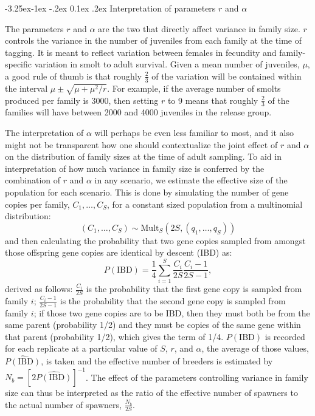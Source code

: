 \documentclass[11pt]{article}
\makeatletter
\renewcommand\subsection{\@startsection{subsection}{2}{\z@}%
                                     {-3.25ex\@plus -1ex \@minus -.2ex}%
                                     {0.1ex \@plus .2ex}%
                                     {\normalfont\normalsize\bfseries}}
\makeatother
\begin{document}
 
\subsection{Interpretation of parameters $r$ and $\alpha$}

The parameters $r$ and $\alpha$ are the two that directly affect variance in family size.  $r$ 
controls the variance in the number of juveniles from each family at the time of tagging.  It is meant
to reflect variation between females in fecundity and family-specific variation in smolt to adult survival.  
Given a mean number of juveniles, $\mu$, a good rule of thumb is that roughly $\frac{2}{3}$ 
of the variation will be contained
within the interval $\mu \pm \sqrt{\mu + \mu^2/r}$.  For example, if the average number of smolts produced
per family is 3000, then setting $r$ to 9 means that roughly $\frac{2}{3}$ of the families will have
between 2000 and 4000 juveniles in the release group.


The interpretation of $\alpha$ will perhaps be even less familiar to most, and it also might not
be transparent how one should contextualize the joint effect of $r$ and $\alpha$ on the distribution
of family sizes at the time of adult sampling.  To aid in interpretation of how much variance in
family size is conferred by the combination of $r$ and $\alpha$ in any scenario, we estimate the
effective size of the population for each scenario.  This is done by simulating the number of
gene copies per family, $C_1,\ldots,C_S$,
for a constant sized population from a multinomial distribution:
\[
(C_1,\ldots, C_S) \sim \mathrm{Mult}_S(2S, (q_1, \ldots, q_S))
\]
and then calculating the probability that two gene copies sampled from amongst those offspring gene copies
are identical by descent (IBD) as:
\[
P(\mathrm{IBD}) = \frac{1}{4}\sum_{i=1}^S \frac{C_i}{2S}\frac{C_i - 1}{2S - 1},
\]
derived as follows: $\frac{C_i}{2S}$ is the probability that the first gene copy is sampled from family $i$;
$\frac{C_i - 1}{2S - 1}$ is the probability that the second gene copy is sampled from family $i$; if those two
gene copies are to be IBD, then they must both be from the same parent (probability 1/2) and they must be copies of
the same gene within that parent (probability 1/2), which gives the term of 1/4.  
$P(\mathrm{IBD})$ is recorded for each replicate at a particular value of $S$, $r$, and $\alpha$, the average
of those values, $\widehat{P(\mathrm{IBD})}$, is taken and the effective number of breeders is estimated
by $N_b = [2\widehat{P(\mathrm{IBD})}]^{-1}$.   The effect of the parameters controlling
variance in family size can thus be interpreted as the ratio of the effective number of spawners to the 
actual number of spawners, $\frac{N_b}{2S}$.
\end{document}
